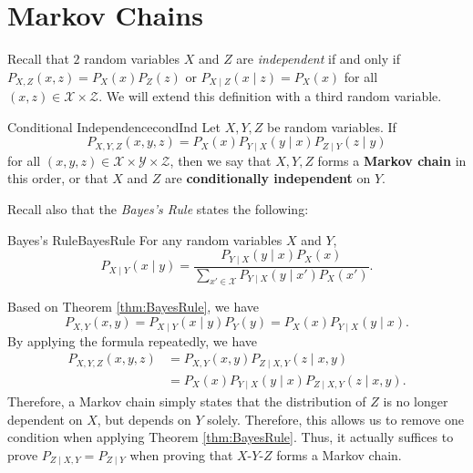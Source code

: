 \documentclass[math, code]{amznotes}
\theoremstyle{remark}
\begin{document}
\section{Markov Chains}
Recall that $2$ random variables $X$ and $Z$ are \textit{independent} if and only if $P_{X, Z}\left(x, z\right) = P_X\left(x\right)P_Z\left(z\right)$ or $P_{X \mid Z}\left(x \mid z\right) = P_X\left(x\right)$ for all $\left(x, z\right) \in \mathcal{X} \times \mathcal{Z}$. We will extend this definition with a third random variable.
\begin{dfnbox}{Conditional Independence}{condInd}
    Let $X, Y, Z$ be random variables. If 
    \begin{equation*}
        P_{X, Y, Z}\left(x, y, z\right) = P_X\left(x\right)P_{Y \mid X}\left(y \mid x\right)P_{Z \mid Y}\left(z \mid y\right)
    \end{equation*}
    for all $\left(x, y, z\right) \in \mathcal{X} \times \mathcal{Y} \times \mathcal{Z}$, then we say that $X, Y, Z$ forms a {\color{red} \textbf{Markov chain}} in this order, or that $X$ and $Z$ are {\color{red} \textbf{conditionally independent}} on $Y$.
\end{dfnbox}
Recall also that the \textit{Bayes's Rule} states the following:
\begin{thmbox}{Bayes's Rule}{BayesRule}
    For any random variables $X$ and $Y$, 
    \begin{equation*}
        P_{X \mid Y}\left(x \mid y\right) = \frac{P_{Y \mid X}\left(y \mid x\right)P_X\left(x\right)}{\sum_{x' \in \mathcal{X}}P_{Y \mid X}\left(y \mid x'\right)P_X\left(x'\right)}.
    \end{equation*}
\end{thmbox}
Based on Theorem \ref{thm:BayesRule}, we have 
\begin{equation*}
    P_{X, Y}\left(x, y\right) = P_{X \mid Y}\left(x \mid y\right)P_Y\left(y\right) = P_X\left(x\right)P_{Y \mid X}\left(y \mid x\right).
\end{equation*}
By applying the formula repeatedly, we have 
\begin{align*}
    P_{X, Y, Z}\left(x, y, z\right) & = P_{X, Y}\left(x, y\right)P_{Z \mid X, Y}\left(z \mid x, y\right) \\
    & = P_X\left(x\right)P_{Y \mid X}\left(y \mid x\right)P_{Z \mid X, Y}\left(z \mid x, y\right).
\end{align*}
Therefore, a Markov chain simply states that the distribution of $Z$ is no longer dependent on $X$, but depends on $Y$ solely. Therefore, this allows us to remove one condition when applying Theorem \ref{thm:BayesRule}. Thus, it actually suffices to prove $P_{Z \mid X, Y} = P_{Z \mid Y}$ when proving that $X$-$Y$-$Z$ forms a Markov chain.  
 
\end{document}
